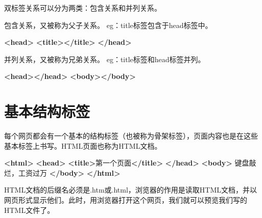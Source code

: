 \documentclass[
]{book}
\newenvironment{Shaded}{\begin{snugshade}}{\end{snugshade}}
\newcommand{\KeywordTok}[1]{\textcolor[rgb]{0.13,0.29,0.53}{\textbf{#1}}}
\newcommand{\NormalTok}[1]{#1}
\begin{document}
双标签关系可以分为两类：包含关系和并列关系。

包含关系，又被称为父子关系。
eg：title标签包含于head标签中。

\begin{Shaded}
\begin{Highlighting}[]
\KeywordTok{\textless{}head\textgreater{}}
    \KeywordTok{\textless{}title\textgreater{}\textless{}/title\textgreater{}}
\KeywordTok{\textless{}/head\textgreater{}}
\end{Highlighting}
\end{Shaded}

并列关系，又被称为兄弟关系。
eg：title标签和head标签并列。

\begin{Shaded}
\begin{Highlighting}[]
\KeywordTok{\textless{}head\textgreater{}\textless{}/head\textgreater{}}
\KeywordTok{\textless{}body\textgreater{}\textless{}/body\textgreater{}}
\end{Highlighting}
\end{Shaded}

\hypertarget{ux57faux672cux7ed3ux6784ux6807ux7b7e}{%
\section{基本结构标签}\label{ux57faux672cux7ed3ux6784ux6807ux7b7e}}

每个网页都会有一个基本的结构标签（也被称为骨架标签），页面内容也是在这些基本标签上书写。HTML页面也称为HTML文档。

\begin{Shaded}
\begin{Highlighting}[]
\KeywordTok{\textless{}html\textgreater{}}
    \KeywordTok{\textless{}head\textgreater{}}     
        \KeywordTok{\textless{}title\textgreater{}}\NormalTok{第一个页面}\KeywordTok{\textless{}/title\textgreater{}} 
    \KeywordTok{\textless{}/head\textgreater{}}
    \KeywordTok{\textless{}body\textgreater{}}
\NormalTok{         键盘敲烂，工资过万}
    \KeywordTok{\textless{}/body\textgreater{}}
\KeywordTok{\textless{}/html\textgreater{}}
\end{Highlighting}
\end{Shaded}

HTML文档的后缀名必须是.htm或.html，浏览器的作用是读取HTML文档，并以网页形式显示他们。此时，用浏览器打开这个网页，我们就可以预览我们写的HTML文件了。
\end{document}
